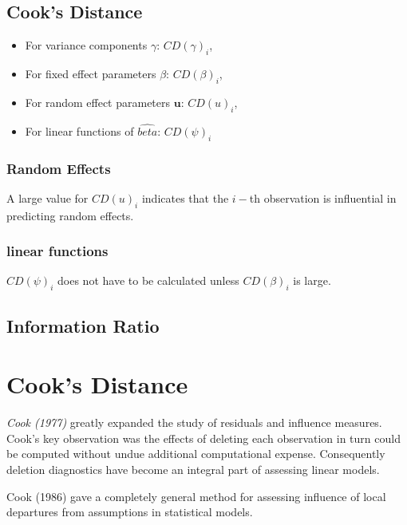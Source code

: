 \documentclass[Main.tex]{subfiles}
\begin{document}
	
	\subsection{Cook's Distance}
	\begin{itemize}
		\item For variance components $\gamma$: $CD(\gamma)_i$,
		\item For fixed effect parameters $\beta$: $CD(\beta)_i$,
		\item For random effect parameters $\boldsymbol{u}$: $CD(u)_i$,
		\item For linear functions of $\hat{beta}$: $CD(\psi)_i$
	\end{itemize}
	
	\newpage
	\subsubsection{Random Effects}
	
	A large value for $CD(u)_i$ indicates that the $i-$th observation is influential in predicting random effects.
	
	\subsubsection{linear functions}
	
	$CD(\psi)_i$ does not have to be calculated unless $CD(\beta)_i$ is large.
	
	
	\subsection{Information Ratio}
	
	\newpage
	\section*{Cook's Distance} %
	
	\textit{Cook (1977)} greatly expanded the study of residuals and influence measures. Cook's key observation was the effects of deleting each observation in turn could be computed without undue additional computational expense. Consequently deletion diagnostics have become an integral part of assessing linear models.
	
	
	Cook (1986) gave a completely general method for assessing influence of local departures from
	assumptions in statistical models.
	
\end{document}
